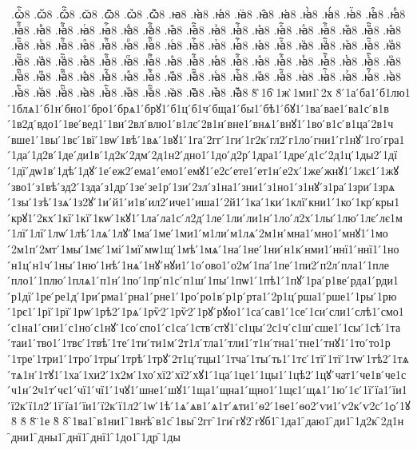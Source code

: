 {.ꙍꙺ҇8
.ꙍꙻ8
.ꙍꙻ҇8
.ꙍ꙼8
.ꙍ꙼҇8
.ꙍ꙽8
.ꙍ꙽҇8
.ꙗ8
.ꙗ̀8
.ꙗ́8
.ꙗ̈8
.ꙗ̑8
.ꙗ҆8
.ꙗ҆̀8
.ꙗ҆́8
.ꙗ҆̈8
.ꙗ҆̑8
.ꙗⷠ8
.ꙗⷠ҇8
.ꙗⷡ8
.ꙗⷡ҇8
.ꙗⷢ8
.ꙗⷢ҇8
.ꙗⷣ8
.ꙗⷣ҇8
.ꙗⷤ8
.ꙗⷤ҇8
.ꙗⷥ8
.ꙗⷥ҇8
.ꙗⷦ8
.ꙗⷦ҇8
.ꙗⷧ8
.ꙗⷧ҇8
.ꙗⷨ8
.ꙗⷨ҇8
.ꙗⷩ8
.ꙗⷩ҇8
.ꙗⷪ8
.ꙗⷪ҇8
.ꙗⷫ8
.ꙗⷫ҇8
.ꙗⷬ8
.ꙗⷬ҇8
.ꙗⷭ8
.ꙗⷭ҇8
.ꙗⷮ8
.ꙗⷮ҇8
.ꙗⷯ8
.ꙗⷯ҇8
.ꙗⷰ8
.ꙗⷰ҇8
.ꙗⷱ8
.ꙗⷱ҇8
.ꙗⷲ8
.ꙗⷲ҇8
.ꙗⷳ8
.ꙗⷳ҇8
.ꙗⷴ8
.ꙗⷴ҇8
.ꙗⷵ8
.ꙗⷵ҇8
.ꙗⷶ8
.ꙗⷶ҇8
.ꙗⷷ8
.ꙗⷷ҇8
.ꙗⷸ8
.ꙗⷸ҇8
.ꙗⷹ8
.ꙗⷹ҇8
.ꙗⷺ8
.ꙗⷺ҇8
.ꙗⷻ8
.ꙗⷻ҇8
.ꙗⷼ8
.ꙗⷼ҇8
.ꙗⷽ8
.ꙗⷽ҇8
.ꙗⷾ8
.ꙗⷾ҇8
.ꙗⷿ8
.ꙗⷿ҇8
.ꙗꙴ8
.ꙗꙴ҇8
.ꙗꙵ8
.ꙗꙵ҇8
.ꙗꙶ8
.ꙗꙶ҇8
.ꙗꙷ8
.ꙗꙷ҇8
.ꙗꙸ8
.ꙗꙸ҇8
.ꙗꙹ8
.ꙗꙹ҇8
.ꙗꙺ8
.ꙗꙺ҇8
.ꙗꙻ8
.ꙗꙻ҇8
.ꙗ꙼8
.ꙗ꙼҇8
.ꙗ꙽8
.ꙗ꙽҇8
8̀
̀1б
̀1ж
̀1ми1
̀2х
8́
́1а
́ба1
́б1лю1
́1блѧ1
́б1н
́бно1
́бро1
́брѧ1
́брꙋ1
́б1ц
́б1ч
́бща1
́бы1
́бѣ1
́бꙋ1
́1ва
́вае1
́ва1с
́в1в
́1в2д
́вдо1
́1ве
́вед1
́1ви
́2вл
́влю1
́в1лє
́2в1н
́вне1
́внѧ1
́внꙋ1
́1во
́в1с
́в1ца
́2в1ч
́вше1
́1вы
́1вє
́1вї
́1вѡ
́1вѣ
́1вѧ
́1вꙋ1
́1га
́2гг
́1ги
́1г2к
́гл2
́г1ло
́гни1
́г1нꙋ
́1го
́гра1
́1да
́1д2в
́1де
́ди1в
́1д2к
́2дм
́2д1н2
́дно1
́1до
́д2р
́1дра1
́1дре
́д1с
́2д1ц
́1ды2
́1дї
́1дї
́дѡ1в
́1дѣ
́1дꙋ
́1е
́еж2
́ема1
́емо1
́емꙋ1
́е2с
́ете1
́ет1н
́е2х
́1же
́жнꙋ1
́1жє1
́1жꙋ
́зво1
́з1вѣ
́зд2
́1зда
́з1др
́1зе
́зе1р
́1зи
́2зл
́з1на1
́зни1
́з1но1
́з1нꙋ
́з1ра
́1зри
́1зрѧ
́1зы
́1зѣ
́1зѧ
́1з2ꙋ
́1и
́й1
́и1в
́ил2
́иче1
́иша1
́2й1
́1ка
́1ки
́1клї
́кни1
́1ко
́1кр
́кры1
́крꙋ1
́2кх
́1кї
́1кї
́1кѡ
́1кꙋ1
́1ла
́ла1с
́л2д
́1ле
́1ли
́ли1н
́1ло
́л2х
́1лы
́1лю
́1лє
́лє1м
́1лї
́1лї
́1лѡ
́1лѣ
́1лѧ
́1лꙋ
́1ма
́1ме
́1ми1
́м1ли
́м1лѧ
́2м1н
́мна1
́мно1
́мнꙋ1
́1мо
́2м1п
́2мт
́1мы
́1мє
́1мі
́1мї
́мѡ1щ
́1мѣ
́1мѧ
́1на
́1не
́1ни
́н1к
́нми1
́ннї1
́ннї1
́1но
́н1ц
́н1ч
́1ны
́1ню
́1нѣ
́1нѧ
́1нꙋ
́нꙋи1
́1о
́ово1
́о2м
́1па
́1пе
́1пи2
́п2л
́пла1
́1пле
́пло1
́1плю
́1плѧ1
́п1н
́1по
́1пр
́п1с
́п1ш
́1пы
́1пѡ1
́1пѣ1
́1пꙋ
́1ра
́р1ве
́рда1
́рди1
́р1дї
́1ре
́ре1д
́1ри
́рма1
́рна1
́рне1
́1ро
́ро1в
́р1р
́рта1
́2р1ц
́рша1
́рше1
́1ры
́1рю
́1рє1
́1рї
́1рї
́1рѡ
́1рѣ2
́1рѧ
́1рѷ2
́1рѷ2
́1рꙋ
́рꙋю1
́1са
́сав1
́1се
́1си
́сли1
́слѣ1
́смо1
́с1на1
́сни1
́с1но
́с1нꙋ
́1со
́спо1
́с1са
́1ств
́стꙋ1
́с1цы
́2с1ч
́с1ш
́сше1
́1сы
́1сѣ
́1та
́таи1
́тво1
́1твє
́1твѣ
́1те
́1ти
́ти1м
́2т1л
́тла1
́тли1
́т1н
́тна1
́тне1
́тнꙋ1
́1то
́то1р
́1тре
́1три1
́1тро
́1тры
́1трѣ
́1трꙋ
́2т1ц
́тцы1
́1тча
́1ты
́ть1
́1тє
́1тї
́1тї
́1тѡ
́1тѣ2
́1тѧ
́тѧ1н
́1тꙋ1
́1ха
́1хи2
́1х2м
́1хо
́хї2
́хї2
́хꙋ1
́1ца
́1це1
́1цы1
́1цѣ2
́1цꙋ
́чат1
́че1в
́че1с
́ч1н
́2ч1т
́чє1
́чї1
́чї1
́1чꙋ1
́шне1
́шꙋ1
́1ща1
́щна1
́щно1
́1щє1
́щѧ1
́1ю
́1є
́1ї
́їа1
́їи1
́ї2к
́ї1л2
́1ї
́їа1
́їи1
́ї2к
́ї1л2
́1ѡ
́1ѣ
́1ѧ
́ѧв1
́ѧ1т
́ѧти1
́ѳ2
́1ѳе1
́ѳо2
́ѵи1
́ѵ2к
́ѵ2с
́1ѻ
́1ꙋ
8̆
8̇
8̈
̈1е
8̏
8̑
̑1ва1
̑в1ни1
̑1внѣ
̑в1с
̑1вы
̑2гг
̑1ги
̑гꙋ2
̑гꙋб1
̑1да1
̑даю1
̑ди1
̑1д2к
̑2д1н
̑дни1
̑дны1
̑днї1
̑днї1
̑1до1
̑1др
̑1ды
}
